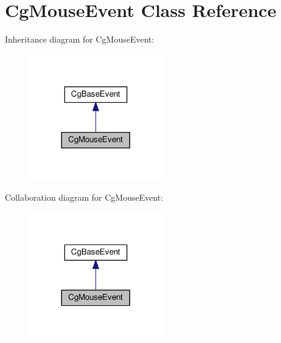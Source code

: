 \hypertarget{class_cg_mouse_event}{}\section{Cg\+Mouse\+Event Class Reference}
\label{class_cg_mouse_event}


Inheritance diagram for Cg\+Mouse\+Event\+:
\nopagebreak
\begin{figure}[H]
\begin{center}
\leavevmode
\includegraphics[width=164pt]{class_cg_mouse_event__inherit__graph}
\end{center}
\end{figure}


Collaboration diagram for Cg\+Mouse\+Event\+:
\nopagebreak
\begin{figure}[H]
\begin{center}
\leavevmode
\includegraphics[width=164pt]{class_cg_mouse_event__coll__graph}
\end{center}
\end{figure}
